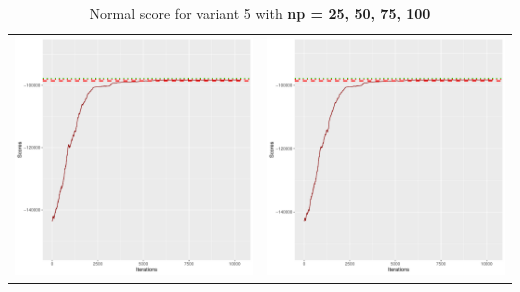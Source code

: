 \documentclass[]{scrartcl}
\begin{document}
\begin{table}[h!]
\begin{tabular}{cc}
\includegraphics[scale = 0.4]{./figs/hepar2/v5/75/boundsEvolution-10352.pdf} & 
\includegraphics[scale = 0.4]{./figs/hepar2/v5/100/boundsEvolution-10352.pdf} \\
\end{tabular}
\caption{Normal score for variant 5 with \textbf{np =  25, 50, 75, 100 }}
\end{table}
\end{document}
